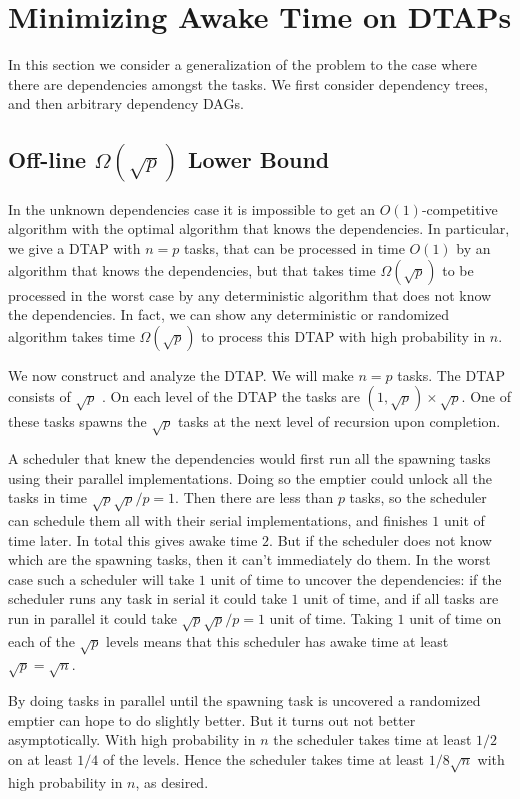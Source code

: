 \section{Minimizing Awake Time on DTAPs} 
\label{sec:awaketimeDeps}
In this section we consider a generalization of the problem to
the case where there are dependencies amongst the tasks. We
first consider dependency trees, and then arbitrary dependency DAGs.

\subsection{Off-line $\Omega(\sqrt{p})$ Lower Bound}
In the unknown dependencies case it is impossible to get an
$O(1)$-competitive algorithm with the optimal algorithm that
knows the dependencies.
In particular, we give a DTAP with $n=p$ tasks, that can be
processed in time $O(1)$ by an algorithm that knows the
dependencies, but that takes time $\Omega(\sqrt{p})$ to be
processed in the worst case by any deterministic algorithm that
does not know the dependencies.
In fact, we can show any deterministic or randomized algorithm
takes time $\Omega(\sqrt{p})$ to process this DTAP with high
probability in $n$.

We now construct and analyze the DTAP. We will make $n=p$ tasks.
The DTAP consists of $\sqrt{p}$ . On each level of
the DTAP the tasks are $(1,\sqrt{p})\times \sqrt{p}$. One of
these tasks spawns the $\sqrt{p}$ tasks at the next level of
recursion upon completion.

A scheduler that knew the dependencies would first run all the
spawning tasks using their parallel implementations. Doing so the
emptier could unlock all the tasks in time $\sqrt{p} \sqrt{p} / p
= 1$. Then there are less than $p$ tasks, so the scheduler can
schedule them all with their serial implementations, and finishes
$1$ unit of time later. In total this gives awake time $2$.
But if the scheduler does not know which are the spawning tasks,
then it can't immediately do them. In the worst case such a
scheduler will take $1$ unit of time to uncover the dependencies:
if the scheduler runs any task in serial it could take $1$ unit
of time, and if all tasks are run in parallel it could take
$\sqrt{p}\sqrt{p} / p = 1$ unit of time.
Taking $1$ unit of time on each of the $\sqrt{p}$ levels means
that this scheduler has awake time at least $\sqrt{p} = \sqrt{n}$.

By doing tasks in parallel until the spawning task is uncovered a
randomized emptier can hope to do slightly better. But it turns
out not better asymptotically.
With high probability in $n$ the scheduler takes time at least
$1/2$ on at least $1/4$ of the levels.
Hence the scheduler takes time at least $1/8 \sqrt{n}$ with high
probability in $n$, as desired.

